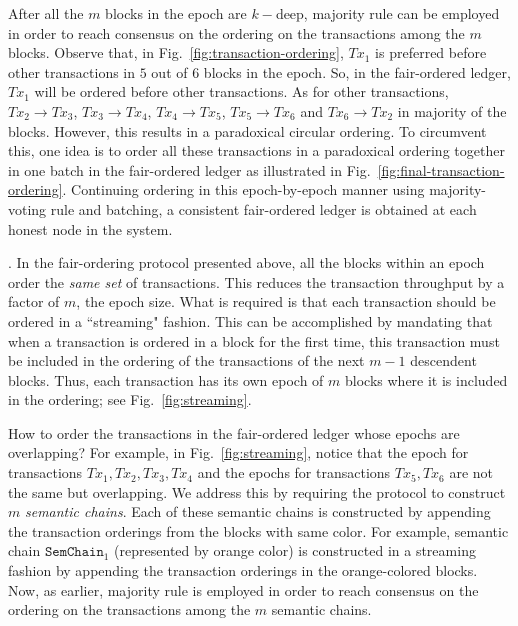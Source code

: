 \documentclass{article}
\begin{document}
After all the $m$ blocks in the epoch are $k-$deep, majority rule can be employed in order to reach consensus on the ordering on the transactions among the $m$ blocks. Observe that, in Fig.~\ref{fig:transaction-ordering}, $Tx_1$ is preferred before other transactions in $5$ out of $6$ blocks in the epoch. So, in the fair-ordered ledger, $Tx_1$ will be ordered before other transactions. As for other transactions, $Tx_2 \rightarrow Tx_3$, $Tx_3\rightarrow Tx_4$, $Tx_4 \rightarrow Tx_5$, $Tx_5 \rightarrow Tx_6$ and $Tx_6 \rightarrow Tx_2$ in majority of the blocks. However, this results in a paradoxical circular ordering. To circumvent this, one idea is to order all these transactions in a paradoxical ordering together in one batch in the fair-ordered ledger as illustrated in Fig.~\ref{fig:final-transaction-ordering}. Continuing ordering in this epoch-by-epoch manner using majority-voting rule and batching, a consistent fair-ordered ledger is obtained at each honest node in the system. 





. In the fair-ordering protocol presented above, all the blocks within an epoch order the {\em same set} of transactions. This  reduces the transaction throughput by a factor of $m$, the epoch size. What is required is that each transaction should be ordered in a ``streaming" fashion. This can be accomplished by mandating that when a transaction is ordered in a block for the first time, this transaction must be included in the ordering of the transactions of the next $m-1$ descendent blocks. Thus, each transaction has its own epoch of $m$ blocks where it is included in the ordering; see Fig.~\ref{fig:streaming}.

How to order the transactions in the fair-ordered ledger whose epochs are overlapping?  For example, in Fig.~\ref{fig:streaming}, notice that the epoch for transactions $Tx_1, Tx_2, Tx_3, Tx_4$ and the epochs for transactions $Tx_5, Tx_6$ are not the same but overlapping. We address this by requiring the protocol to construct $m$ {\em semantic chains}. Each of these semantic chains is constructed by appending the transaction orderings from the blocks with same color. For example, semantic chain $\texttt{SemChain}_1$ (represented by orange color) is constructed in a streaming fashion by appending the transaction orderings in the orange-colored blocks. Now, as earlier, majority rule is employed in order to reach consensus on the ordering on the transactions among the $m$ semantic chains. 
\end{document}
